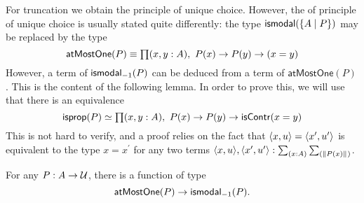 For truncation we obtain the principle of unique choice. 
However, the of principle of unique choice is usually stated quite differently:
the type $\mathsf{ismodal}(\{A\mid P\})$ may be replaced by the type
\begin{equation*}
\mathsf{atMostOne}(P) \equiv  \prd{x,y:A} P(x)\to P(y)\to(x= y)
\end{equation*}
However, a term of $\mathsf{ismodal}_{-1}(P)$ can be deduced from a term of $\mathsf{atMostOne}(P)$. This is the content of the following
lemma. In order to prove this, we will use that there is an equivalence
\begin{equation*}
\mathsf{isprop}(P)\simeq \prd{x,y:A} P(x)\to P(y)\to\iscontr(x= y)
\end{equation*}
This is not hard to verify, and a proof relies on the fact that ${\langle x,u\rangle}={\langle x^\prime,u^\prime\rangle}$ is equivalent to the type
$x= x^\prime$ for any two terms $\pairr{x,u},\pairr{x^\prime,u^\prime}:\sm{x:A}{\brck{P(x)}}$.


\begin{lem}\label{lem:atmostone_to_atlevel}
For any $P:A\to\mathcal{U}$, there is a function of type
\begin{equation*}
\mathsf{atMostOne}(P)\to\mathsf{ismodal}_{-1}(P).
\end{equation*}
\end{lem}

